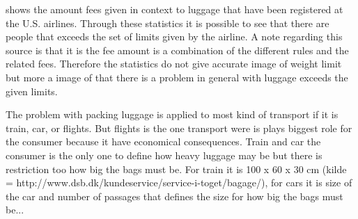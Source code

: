 \citep{airstat} shows the amount fees given in context to luggage that have been registered at the U.S. airlines. Through these statistics it is possible to see that there are people that exceeds the set of limits given by the airline. A note regarding this source is that it is the fee amount is a combination of the different rules and the related fees. Therefore the statistics do not give accurate image of weight limit but more a image of that there is a problem in general with luggage exceeds the given limits.

The problem with packing luggage is applied to most kind of transport if it is train, car, or flights. But flights is the one transport were is plays biggest role for the consumer because it have economical consequences. Train and car the consumer is the only one to define how heavy luggage may be but there is restriction too how big the bags must be. For train it is 100 x 60 x 30 cm (kilde = http://www.dsb.dk/kundeservice/service-i-toget/bagage/), for cars it is size of the car and number of passages that defines the size for how big the bags must be...